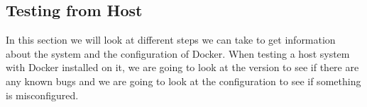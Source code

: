 \subsection{Testing from Host}\label{subsection:testing-host}
In this section we will look at different steps we can take to get information about the system and the configuration of Docker. When testing a host system with Docker installed on it, we are going to look at the version to see if there are any known bugs and we are going to look at the configuration to see if something is misconfigured.






